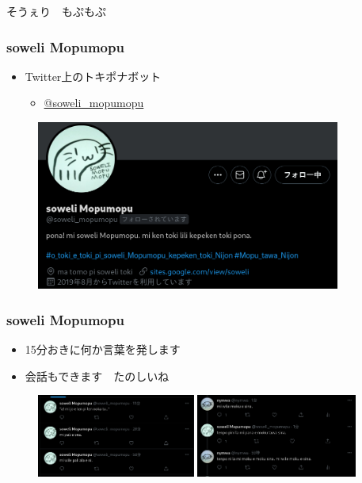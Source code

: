 \documentclass[14pt]{beamer}
\begin{document}
\begin{frame}
	\begin{center}
		{\huge \color{cyan} そうぇり　もぷもぷ}
	\end{center}
\end{frame}


\begin{frame}
	\frametitle{soweli Mopumopu}
	
	\begin{itemize}
		\item Twitter上のトキポナボット
			\begin{itemize}
				\item \href{https://twitter.com/soweli_mopumopu}{@soweli\_mopumopu}
			\end{itemize}
	\end{itemize}
	
	\begin{figure}[H]
		\centering
		\includegraphics[width=10cm]{mopumopu.png}
	\end{figure}
\end{frame}

\begin{frame}
	\frametitle{soweli Mopumopu}
	
	\begin{itemize}
		\item 15分おきに何か言葉を発します
		\item 会話もできます　たのしいね
	\end{itemize}
	
	\begin{figure}[H]
		\centering
		\begin{minipage}{0.45\linewidth}
			\includegraphics[height=2.7cm]{mopu1.png}
		\end{minipage}
		\begin{minipage}{0.45\linewidth}
			\includegraphics[height=2.7cm]{mopu2.png}
		\end{minipage}
	\end{figure}
\end{frame}
\end{document}
